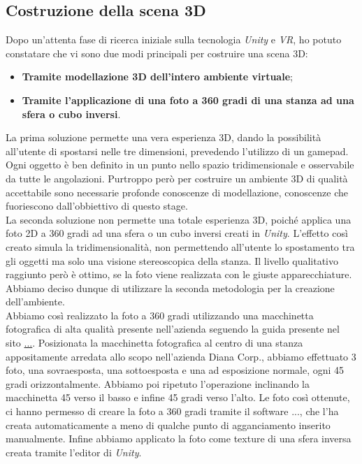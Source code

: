 \subsection{Costruzione della scena 3D}

Dopo un'attenta fase di ricerca iniziale sulla tecnologia \textit{Unity} e \textit{VR}, ho potuto constatare che vi sono due modi principali per costruire una scena 3D:

\begin{itemize}
	\item \textbf{Tramite modellazione 3D dell'intero ambiente virtuale};
	\item \textbf{Tramite l'applicazione di una foto a 360 gradi di una stanza ad una sfera o cubo inversi}.
\end{itemize}

La prima soluzione permette una vera esperienza 3D, dando la possibilità all'utente di spostarsi nelle tre dimensioni, prevedendo l'utilizzo di un gamepad. Ogni oggetto è ben definito in un punto nello spazio tridimensionale e osservabile da tutte le angolazioni. Purtroppo però per costruire un ambiente 3D di qualità accettabile sono necessarie profonde conoscenze di modellazione, conoscenze che fuoriescono dall'obbiettivo di questo stage. \\
La seconda soluzione non permette una totale esperienza 3D, poiché applica una foto 2D a 360 gradi ad una sfera o un cubo inversi creati in \textit{Unity}. L'effetto così creato simula la tridimensionalità, non permettendo all'utente lo spostamento tra gli oggetti ma solo una visione stereoscopica della stanza. Il livello qualitativo raggiunto però è ottimo, se la foto viene realizzata con le giuste apparecchiature. Abbiamo deciso dunque di utilizzare la seconda metodologia per la creazione dell'ambiente. \\
Abbiamo così realizzato la foto a 360 gradi utilizzando una macchinetta fotografica di alta qualità presente nell'azienda seguendo la guida presente nel sito \url{...}. Posizionata la macchinetta fotografica al centro di una stanza appositamente arredata allo scopo nell'azienda Diana Corp., abbiamo effettuato 3 foto, una sovraesposta, una sottoesposta e una ad esposizione normale, ogni 45 gradi orizzontalmente. Abbiamo poi ripetuto l'operazione inclinando la macchinetta 45 verso il basso e infine 45 gradi verso l'alto. Le foto così ottenute, ci hanno permesso di creare la foto a 360 gradi tramite il software ..., che l'ha creata automaticamente a meno di qualche punto di agganciamento inserito manualmente. Infine abbiamo applicato la foto come texture di una sfera inversa creata tramite l'editor di \textit{Unity}.

